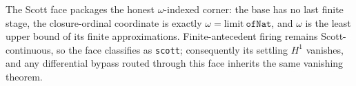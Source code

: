 \begin{theorem}[The Scott face is the $\kappa=\omega$ vanishing bridge]\label{thm:scott-face-omega-bridge}\leanok{}
The Scott face packages the honest \(\omega\)-indexed corner: the base has no
last finite stage, the closure-ordinal coordinate is exactly
\(\omega=\mathrm{limit}\ \texttt{ofNat}\), and \(\omega\) is the least upper
bound of its finite approximations.  Finite-antecedent firing remains
Scott-continuous, so the face classifies as \texttt{scott}; consequently its
settling \(H^1\) vanishes, and any differential bypass routed through this
face inherits the same vanishing theorem.
\end{theorem}

